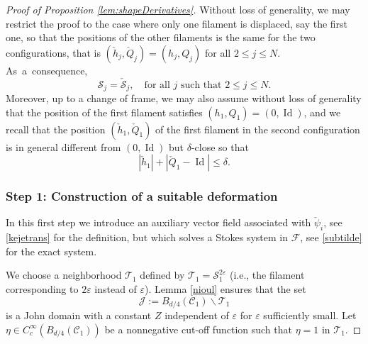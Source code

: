 \documentclass[11pt]{article}
\newcommand{\ie}{i.e.,\xspace}
\providecommand{\widecheck}{\check}
\let\eps\varepsilon
\DeclareMathOperator{\Id}{Id}
\theoremstyle{definition}
\theoremstyle{remark}
\begin{document}
\begin{proof}[Proof of Proposition \ref{lem:shapeDerivatives}]
Without loss of generality, we may restrict the proof to the case where only one filament is displaced, say the first one, so that the positions of the other filaments is the same for the two configurations, that is $(\widecheck h_j, \widecheck Q_j) = (h_j,Q_j)$ for all $2 \leq j \leq N$. As~a~consequence,
\begin{equation}
\label{lezautre}
{\mathcal S}_j = \widecheck {\mathcal S}_j, \quad\text{for all $j$ such that } 2 \leq j \leq N.
\end{equation}
Moreover, up to a change of frame, we may also assume without loss of generality that the position of the first filament satisfies $(h_1,Q_1) = (0,\Id)$, and we recall that the position $(\widecheck h_1, \widecheck Q_1)$ of the first filament in the second configuration is in general different from $(0,\Id)$ but $\delta$-close so that
\begin{equation} \label{delta-c}
|\widecheck h_1 | + |\widecheck Q_1 - \Id | \leq \delta.
\end{equation}

\subsubsection*{Step 1: Construction of a suitable deformation}
In this first step we introduce an auxiliary vector field associated with $\widecheck \psi_i$, see \eqref{kejetrans} for the definition, but which solves a Stokes system in $\mathcal F$, see \eqref{subtilde} for the exact system.

We choose a neighborhood $\mathcal T_1$ defined by $\mathcal T_1 = \mathcal S_1^{2\eps}$ (\ie the filament corresponding to $2 \eps$ instead of $\eps$). Lemma \ref{nioul} ensures that the set
\begin{equation} \label{J}
\mathcal J := B_{d/4}(\mathcal C_1) \smallsetminus \mathcal T_1
\end{equation}
is a John domain with a constant $Z$ independent of $\eps$ for $\eps$ sufficiently small.
Let $\eta \in C_c^{\infty}(B_{d/4}(\mathcal C_1))$ be a nonnegative cut-off function such that
$\eta = 1$ in $\mathcal T_1$.


\end{proof}
\end{document}
